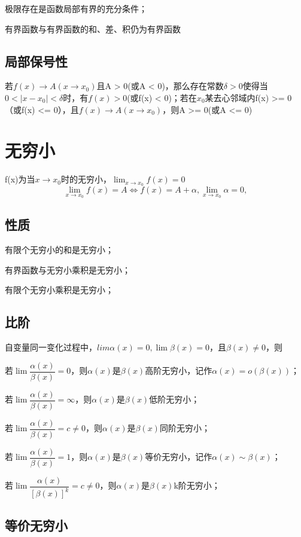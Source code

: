 极限存在是函数局部有界的充分条件；

有界函数与有界函数的和、差、积仍为有界函数


\subsection{局部保号性}
若\(f(x) \to A(x \to x_0)\)且A > 0(或A < 0)，那么存在常数\(\delta > 0\)使得当\(0 < |x - x_0| < \delta\)时，有\(f(x) > 0\)(或f(x) < 0)；若在\(x_0\)某去心邻域内f(x) >= 0（或f(x) <= 0），且\(f(x) \to A(x \to x_0)\)，则A >= 0(或A <= 0)


\section{无穷小}
f(x)为当\(x \to x_0\)时的无穷小，\(\displaystyle \lim_{x \to x_0}f(x) = 0\)
\[\lim_{x \to x_0}f(x) = A \Leftrightarrow f(x) = A + \alpha,\lim_{x \to x_0}\alpha = 0,\]

\subsection{性质}
有限个无穷小的和是无穷小；

有界函数与无穷小乘积是无穷小；

有限个无穷小乘积是无穷小；


\subsection{比阶}
自变量同一变化过程中，\(lim\alpha(x) = 0, \lim\beta(x) = 0\)，且\(\beta(x) \neq 0\)，则

若\(\lim\dfrac{\alpha(x)}{\beta(x)} = 0\)，则\(\alpha(x)\)是\(\beta(x)\)高阶无穷小，记作\(\alpha(x) = o(\beta(x))\)；

若\(\lim\dfrac{\alpha(x)}{\beta(x)} = \infty\)，则\(\alpha(x)\)是\(\beta(x)\)低阶无穷小；

若\(\lim\dfrac{\alpha(x)}{\beta(x)} = c \neq 0\)，则\(\alpha(x)\)是\(\beta(x)\)同阶无穷小；

若\(\lim\dfrac{\alpha(x)}{\beta(x)} = 1\)，则\(\alpha(x)\)是\(\beta(x)\)等价无穷小，记作\(\alpha(x) \sim \beta(x)\)；

若\(\lim\dfrac{\alpha(x)}{[\beta(x)]^k} = c \neq 0\)，则\(\alpha(x)\)是\(\beta(x)\)k阶无穷小；

\subsection{等价无穷小}

